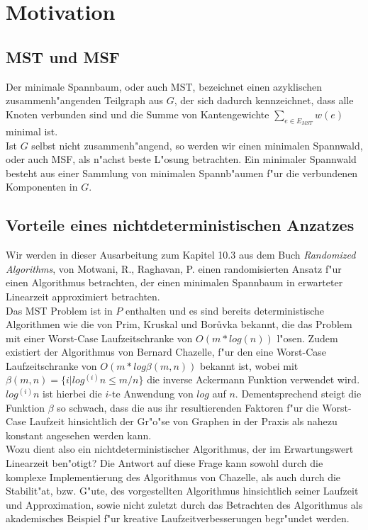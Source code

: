 \section{Motivation}

\subsection{MST und MSF}
Der minimale Spannbaum, oder auch MST, bezeichnet einen azyklischen 
    zusammenh"angenden Teilgraph aus $G$, der sich dadurch kennzeichnet, dass
    alle Knoten verbunden sind und
    die Summe von Kantengewichte $\sum_{e \in E_{MST}} w(e)$
    minimal ist.\\
Ist $G$ selbst nicht zusammenh"angend, so werden wir einen minimalen Spannwald,
    oder auch MSF,
    als n"achst beste L"osung betrachten.
    Ein minimaler Spannwald besteht aus einer Sammlung von minimalen 
    Spannb"aumen f"ur die verbundenen Komponenten in $G$.\\

\subsection{Vorteile eines nichtdeterministischen Anzatzes}

Wir werden in dieser Ausarbeitung zum Kapitel 10.3 aus dem Buch
    \textit{Randomized Algorithms}, von 
    Motwani, R., Raghavan, P.
    \cite{randAlg}
    einen
    randomisierten Ansatz f"ur einen Algorithmus betrachten, 
    der einen minimalen Spannbaum
    in erwarteter Linearzeit approximiert betrachten.\\
Das MST Problem ist in $P$ enthalten und es sind bereits 
    deterministische Algorithmen wie die von
    Prim, Kruskal und Bor\r uvka bekannt, 
    die das Problem mit einer Worst-Case Laufzeitschranke 
    von $O(m * log(n))$ l"osen.
    Zudem existiert der Algorithmus von Bernard Chazelle, f"ur den eine
    Worst-Case Laufzeitschranke von $O(m * log \beta(m,n))$ bekannt ist, wobei
    mit
    $\beta(m,n) = \{i | log^{(i)} n \leq m / n\}$ die inverse Ackermann Funktion
    verwendet wird. 
    $log^{(i)} n$ ist hierbei die $i$-te Anwendung von $log$ auf $n$.
    Dementsprechend steigt die Funktion $\beta$ so schwach, dass die
    aus ihr resultierenden Faktoren f"ur die Worst-Case Laufzeit hinsichtlich
    der Gr"o"se von Graphen in der Praxis als nahezu konstant angesehen werden 
    kann.\\
Wozu dient also ein nichtdeterministischer Algorithmus, der im Erwartungswert 
    Linearzeit ben"otigt?
    Die Antwort auf diese Frage kann sowohl durch die komplexe Implementierung
    des Algorithmus von Chazelle, als auch durch die Stabilit"at, bzw. G"ute,
    des vorgestellten Algorithmus hinsichtlich seiner Laufzeit und Approximation,
    sowie nicht zuletzt durch das Betrachten des Algorithmus als akademisches
    Beispiel f"ur kreative Laufzeitverbesserungen begr"undet werden.\\
